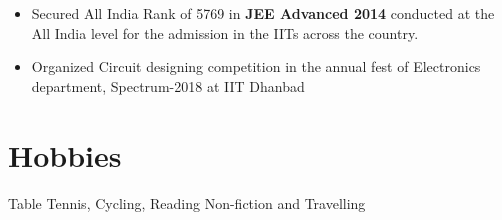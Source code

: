 \documentclass[a4paper,11pt]{article}
\begin{document}
\begin{itemize}
    \item Secured All India Rank of 5769 in \textbf{JEE Advanced 2014} conducted at the All India level for the admission in the IITs across the country. 
    \item Organized Circuit designing competition in the annual fest of Electronics department, Spectrum-2018 at IIT Dhanbad
\end{itemize}
\vspace{-4mm}
\section{Hobbies}
\vspace{-0.4mm}
Table Tennis, Cycling, Reading Non-fiction and Travelling\\
\vspace{20mm}
\end{document}
